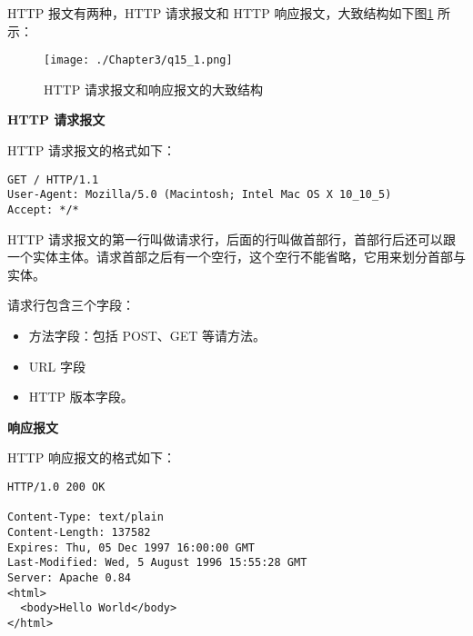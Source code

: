 \documentclass[cn,11pt,color=blue,lang=cn]{elegantbook}
\begin{document}
\begin{solution}
HTTP 报文有两种，HTTP 请求报文和 HTTP 响应报文，大致结构如下图\ref{fig15_1} 所示：
\begin{figure}[htbp]
\centering
\texttt{[image: ./Chapter3/q15\_1.png]}
\caption{HTTP 请求报文和响应报文的大致结构}
\label{fig15_1}
\end{figure}

\begin{note} \textbf{HTTP 请求报文} \end{note}
HTTP 请求报文的格式如下：

\begin{lstlisting}
GET / HTTP/1.1                                                   
User-Agent: Mozilla/5.0 (Macintosh; Intel Mac OS X 10_10_5)      
Accept: */*                                                       
\end{lstlisting}

HTTP 请求报文的第一行叫做请求行，后面的行叫做首部行，首部行后还可以跟一个实体主体。请求首部之后有一个空行，这个空行不能省略，它用来划分首部与实体。

请求行包含三个字段：
\begin{itemize}
	\item 方法字段：包括 POST、GET 等请方法。
	\item URL 字段
	\item HTTP 版本字段。
\end{itemize}

\begin{note} \textbf{响应报文} \end{note}
HTTP 响应报文的格式如下：
\begin{lstlisting}
HTTP/1.0 200 OK                                    

Content-Type: text/plain
Content-Length: 137582                             
Expires: Thu, 05 Dec 1997 16:00:00 GMT             
Last-Modified: Wed, 5 August 1996 15:55:28 GMT     
Server: Apache 0.84
<html>
  <body>Hello World</body>
</html>                                                     
\end{lstlisting}


\end{solution}
\end{document}
